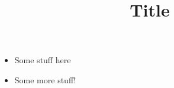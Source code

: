 \documentclass{article}
\title{Title}
\date{}
\begin{document}
	\maketitle
	 
		\begin{itemize}
			\item Some stuff here
			\item Some more stuff!
		\end{itemize}
\end{document}
